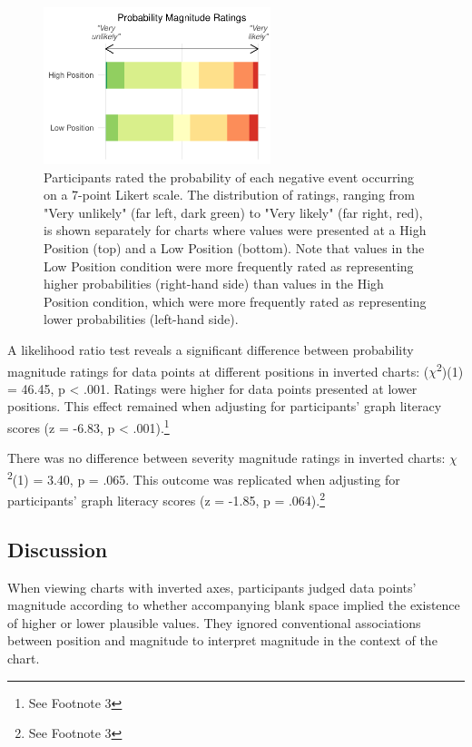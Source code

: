 \documentclass[journal]{vgtc}                %
\begin{document}
\begin{figure}
\includegraphics[width=250px]{position_magnitude_files/figure-latex/r3-c-plot-1} \caption{Participants rated the probability of each negative event occurring on a 7-point Likert scale. The distribution of ratings, ranging from "Very unlikely" (far left, dark green) to "Very likely" (far right, red), is shown separately for charts where values were presented at a High Position (top) and a Low Position (bottom). Note that values in the Low Position condition were more frequently rated as representing higher probabilities (right-hand side) than values in the High Position condition, which were more frequently rated as representing lower probabilities (left-hand side).}\label{fig:r3-c-plot}
\end{figure}

A likelihood ratio test reveals a significant difference between probability magnitude ratings for data points at different positions in inverted charts: (\(\chi\)\textsuperscript{2})(1) = 46.45, p \textless{} .001. Ratings were higher for data points presented at lower positions. This effect remained when adjusting for participants' graph literacy scores (z = -6.83, p \textless{} .001).\footnote{See Footnote 3}

There was no difference between severity magnitude ratings in inverted charts: \(\chi\)\textsuperscript{2}(1) = 3.40, p = .065. This outcome was replicated when adjusting for participants' graph literacy scores (z = -1.85, p = .064).\footnote{See Footnote 3}

\hypertarget{discussion-2}{%
\subsection{Discussion}\label{discussion-2}}

When viewing charts with inverted axes, participants judged data points' magnitude according to whether accompanying blank space implied the existence of higher or lower plausible values. They ignored conventional associations between position and magnitude to interpret magnitude in the context of the chart.
\end{document}
